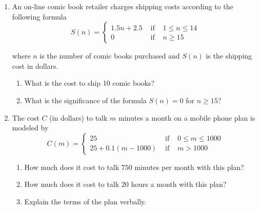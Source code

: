 {\begin{enumerate}
\begin{enumerate}
\end{enumerate}

\item \label{piecewiseshipping} An on-line comic book retailer charges shipping costs according to the following formula \[{\displaystyle S(n) = \left\{ \begin{array}{rcl}  1.5 n + 2.5 & \mbox{ if } & 1 \leq n \leq 14  \\
                                                            0  & \mbox{ if } & n \geq 15
                                     \end{array} \right. }\]
                                     
where $n$ is the number of  comic books purchased and $S(n)$ is the shipping cost in dollars.
                                     
\begin{enumerate}

\item  What is the cost to ship 10 comic books?  %

\item  What is the significance of the formula $S(n) = 0$ for $n \geq 15$?   %
 
\end{enumerate}

\item  \label{piecewisemobile} The cost $C$ (in dollars) to talk $m$ minutes a month on a mobile phone plan is modeled by   \[{\displaystyle C(m) = \left\{ \begin{array}{rcl} 25 & \mbox{ if } & 0 \leq m \leq 1000 \\
                                                            25+0.1(m-1000) & \mbox{ if } & m > 1000
                                     \end{array} \right. }\]
                                     
\begin{enumerate}

\item  How much does it cost to talk $750$ minutes per month with this plan?  %

\item  How much does it cost to talk $20$ hours a month with this plan?  %

\item  Explain the terms of the plan verbally.  %
 

\end{enumerate}
\end{enumerate}}
